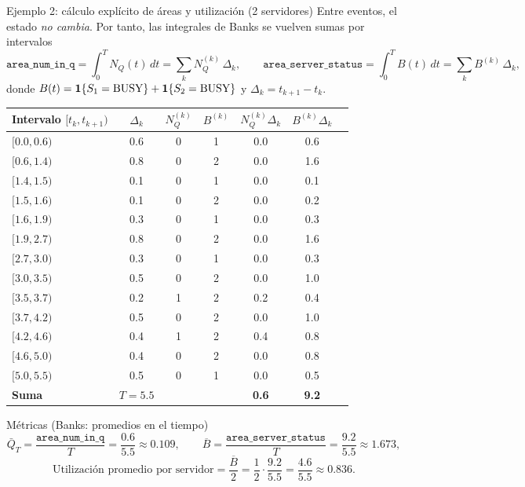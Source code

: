 \documentclass[aspectratio=1610, 9pt]{beamer}
\begin{document}
\begin{frame}{Ejemplo 2: cálculo explícito de áreas y utilización (2 servidores)}
\small
Entre eventos, el estado \emph{no cambia}. Por tanto, las integrales de Banks se vuelven sumas por intervalos
\[
\texttt{area\_num\_in\_q}=\int_0^T N_Q(t)\,dt=\sum_k N_Q^{(k)}\,\Delta_k,
\qquad
\texttt{area\_server\_status}=\int_0^T B(t)\,dt=\sum_k B^{(k)}\,\Delta_k,
\]
donde $B(t)=\mathbf{1}\{S_1=\text{BUSY}\}+\mathbf{1}\{S_2=\text{BUSY}\}$ y $\Delta_k=t_{k+1}-t_k$.

\vspace{2pt}
\tiny
\setlength{\tabcolsep}{2.6pt}
\renewcommand{\arraystretch}{1.12}
\begin{table}
\centering
\begin{tabular}{@{}lcccccc@{}}
\toprule
Intervalo $[t_k,t_{k+1})$ & $\Delta_k$ & $N_Q^{(k)}$ & $B^{(k)}$ & $N_Q^{(k)}\Delta_k$ & $B^{(k)}\Delta_k$\\
\midrule
$[0.0,0.6)$ & 0.6 & 0 & 1 & 0.0 & 0.6\\
$[0.6,1.4)$ & 0.8 & 0 & 2 & 0.0 & 1.6\\
$[1.4,1.5)$ & 0.1 & 0 & 1 & 0.0 & 0.1\\
$[1.5,1.6)$ & 0.1 & 0 & 2 & 0.0 & 0.2\\
$[1.6,1.9)$ & 0.3 & 0 & 1 & 0.0 & 0.3\\
$[1.9,2.7)$ & 0.8 & 0 & 2 & 0.0 & 1.6\\
$[2.7,3.0)$ & 0.3 & 0 & 1 & 0.0 & 0.3\\
$[3.0,3.5)$ & 0.5 & 0 & 2 & 0.0 & 1.0\\
$[3.5,3.7)$ & 0.2 & 1 & 2 & 0.2 & 0.4\\
$[3.7,4.2)$ & 0.5 & 0 & 2 & 0.0 & 1.0\\
$[4.2,4.6)$ & 0.4 & 1 & 2 & 0.4 & 0.8\\
$[4.6,5.0)$ & 0.4 & 0 & 2 & 0.0 & 0.8\\
$[5.0,5.5)$ & 0.5 & 0 & 1 & 0.0 & 0.5\\
\midrule
\textbf{Suma} & \textbf{$T=5.5$} &  &  & \textbf{0.6} & \textbf{9.2}\\
\bottomrule
\end{tabular}
\end{table}

\scriptsize
\vspace{-2pt}
\begin{block}{Métricas (Banks: promedios en el tiempo)}
\[
\bar Q_T=\frac{\texttt{area\_num\_in\_q}}{T}=\frac{0.6}{5.5}\approx 0.109,
\qquad
\overline{B}=\frac{\texttt{area\_server\_status}}{T}=\frac{9.2}{5.5}\approx 1.673,
\]
\[
\text{Utilización promedio por servidor}=\frac{\overline{B}}{2}
=\frac{1}{2}\cdot\frac{9.2}{5.5}=\frac{4.6}{5.5}\approx 0.836.
\]
\end{block}
\end{frame}
\end{document}
